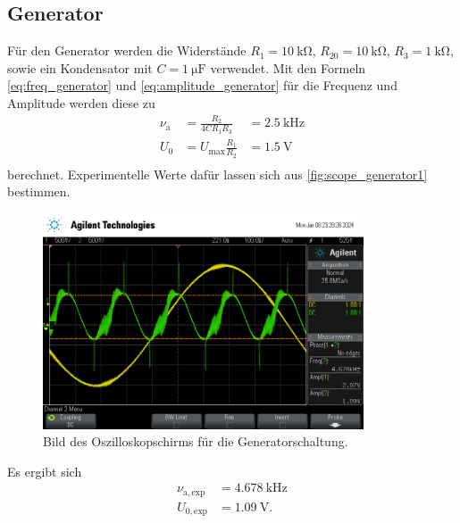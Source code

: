 \subsection{Generator}
Für den Generator werden die Widerstände $R_1=\qty{10}{\kilo\ohm}$, $R_20=\qty{10}{\kilo\ohm}$, $R_3=\qty{1}{\kilo\ohm}$, sowie ein Kondensator mit $C=\qty{1}{\micro\farad}$ verwendet.
Mit den Formeln \eqref{eq:freq_generator} und \eqref{eq:amplitude_generator} für die Frequenz und Amplitude werden diese zu
\begin{align*}
  \nu_\text{a} &= \frac{R_2}{4C R_1 R_3} &=\qty{2,5}{\kilo\hertz} \\
  U_0 &= U_\text{max} \frac{R_1}{R_2} &=\qty{1,5}{\volt} \\
\end{align*}
berechnet. Experimentelle Werte dafür lassen sich aus \autoref{fig:scope_generator1} bestimmen.
\begin{figure}
  \centering
  \includegraphics[height=6.4cm]{content/scope/scope_16.png}
  \caption{Bild des Oszilloskopschirms für die Generatorschaltung.}
  \label{fig:scope_generator1}
\end{figure}
Es ergibt sich
\begin{align*}
  \nu_{\mathrm{a, exp}} &= \qty{4,678}{\kilo\hertz} \\
  U_{0, \mathrm{exp}} &= \qty{1,09}{\volt}.
\end{align*}

